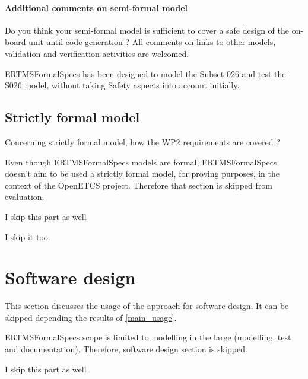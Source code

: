 \paragraph{Additional comments on semi-formal  model} Do you think your semi-formal  model is sufficient to cover a safe design of the on-board unit until code generation ?
All comments on links to  other models, validation and verification activities are welcomed.

\begin{author_comment}
ERTMSFormalSpecs has been designed to model the Subset-026 and test the S026 model, without taking Safety aspects into account initially.    
\end{author_comment}

\subsection{Strictly formal model}

Concerning strictly formal model, how the WP2 requirements are covered ?

\begin{author_comment}
Even though ERTMSFormalSpecs models are formal, ERTMSFormalSpecs doesn't aim to be used a strictly formal model, for proving purposes, in the context of the OpenETCS project. Therefore that section is skipped from evaluation.  
\end{author_comment}

\begin{assessor1}
I skip this part as well
\end{assessor1}

\begin{assessor2}
I skip it too.
\end{assessor2}


\section{Software design}
This section discusses the usage of the approach for software design.
It can be skipped depending the results of \ref{main_usage}.

\begin{author_comment}
ERTMSFormalSpecs scope is limited to modelling in the large (modelling, test and documentation). Therefore, software design section is skipped.  
\end{author_comment}

\begin{assessor1}
I skip this part as well
\end{assessor1}


